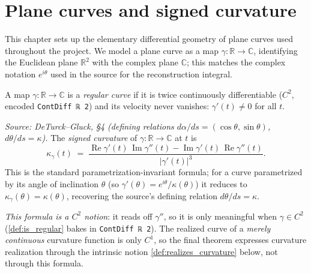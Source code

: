\chapter{Plane curves and signed curvature}
\label{chap:curve}


This chapter sets up the elementary differential geometry of plane curves used
throughout the project. We model a plane curve as a map $\gamma : \mathbb{R} \to
\mathbb{C}$, identifying the Euclidean plane $\mathbb{R}^2$ with the complex
plane $\mathbb{C}$; this matches the complex notation $e^{i\theta}$ used in the
source for the reconstruction integral.

\begin{definition}
  \label{def:is_regular}
  A map $\gamma : \mathbb{R} \to \mathbb{C}$ is a \emph{regular curve} if it is
  twice continuously differentiable ($C^2$, encoded \texttt{ContDiff ℝ 2}) and
  its velocity never vanishes: $\gamma'(t) \neq 0$ for all $t$.
\end{definition}

\begin{definition}
  \label{def:signed_curvature}
  \textit{Source: DeTurck--Gluck, §4 (defining relations $d\alpha/ds = (\cos\theta,\sin\theta)$, $d\theta/ds = \kappa$).}
  The \emph{signed curvature} of $\gamma : \mathbb{R} \to \mathbb{C}$ at $t$ is
  \[
    \kappa_\gamma(t) \;=\;
      \frac{\operatorname{Re}\gamma'(t)\,\operatorname{Im}\gamma''(t)
            - \operatorname{Im}\gamma'(t)\,\operatorname{Re}\gamma''(t)}
           {\lvert \gamma'(t)\rvert^{3}} .
  \]
  This is the standard parametrization-invariant formula; for a curve
  parametrized by its angle of inclination $\theta$ (so $\gamma'(\theta) =
  e^{i\theta}/\kappa(\theta)$) it reduces to $\kappa_\gamma(\theta) =
  \kappa(\theta)$, recovering the source's defining relation $d\theta/ds =
  \kappa$.

  \emph{This formula is a $C^2$ notion}: it reads off $\gamma''$, so it is only
  meaningful when $\gamma \in C^2$ (\cref{def:is_regular} bakes in
  \texttt{ContDiff ℝ 2}). The realized curve of a \emph{merely continuous}
  curvature function is only $C^1$, so the final theorem expresses curvature
  realization through the intrinsic notion \cref{def:realizes_curvature} below,
  not through this formula.
\end{definition}

